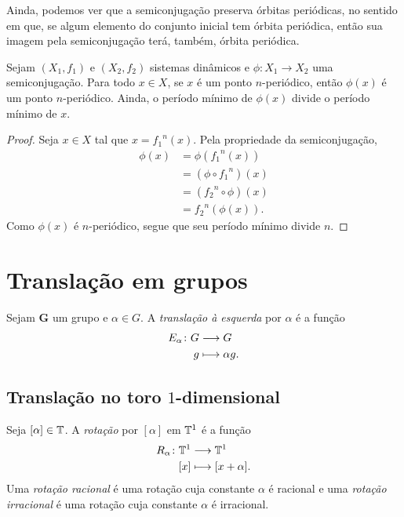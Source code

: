 Ainda, podemos ver que a semiconjugação preserva órbitas periódicas, no sentido em que, se algum elemento do conjunto inicial tem órbita periódica, então sua imagem pela semiconjugação terá, também, órbita periódica.

\begin{proposition}
Sejam $(X_1,f_1)$ e $(X_2,f_2)$ sistemas dinâmicos e $\phi: X_1 \to X_2$ uma semiconjugação. Para todo $x \in X$, se $x$ é um ponto $n$-periódico, então $\phi(x)$ é um ponto $n$-periódico. Ainda, o período mínimo de $\phi(x)$ divide o período mínimo de $x$.
\end{proposition}
\begin{proof} Seja $x \in X$ tal que $x = {f_1}^n(x)$. Pela propriedade da semiconjugação,
	\begin{align*}
	\phi(x) & = \phi({f_1}^n(x)) \\
      		  	 & = (\phi \circ {f_1}^n)(x) \\
      		  	 & = ({f_2}^n \circ \phi)(x) \\
      		  	 & = {f_2}^n(\phi(x)).
	\end{align*}
Como $\phi(x)$ é $n$-periódico, segue que seu período mínimo divide $n$.
\end{proof}


\section{Translação em grupos}

\begin{definition}
Sejam $\bm G$ um grupo e $\alpha \in G$. A \emph{translação à esquerda} por $\alpha$ é a função
	\begin{align*}
	{E_\alpha}\colon {G} &\longrightarrow {G} \\{g} &\longmapsto \alpha g.
	\end{align*}
\end{definition}

\subsection{Translação no toro $1$-dimensional}

\begin{definition}
Seja $[\alpha] \in \mathbb{T}$. A \emph{rotação} por $[\alpha]$ em $\mathbb{T}^1$ é a função
	\begin{align*}
	{R_\alpha}\colon {\mathbb{T}^1} &\longrightarrow {\mathbb{T}^1} \\{[x]} &\longmapsto [x+\alpha].
	\end{align*}
Uma \emph{rotação racional} é uma rotação cuja constante $\alpha$ é racional e uma \emph{rotação irracional} é uma rotação cuja constante $\alpha$ é irracional.
\end{definition}

